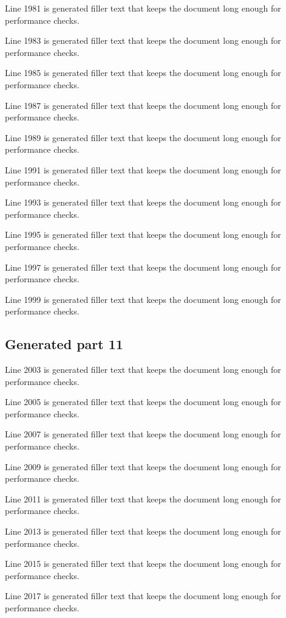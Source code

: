 Line 1981 is generated filler text that keeps the document long enough for performance checks.

Line 1983 is generated filler text that keeps the document long enough for performance checks.

Line 1985 is generated filler text that keeps the document long enough for performance checks.

Line 1987 is generated filler text that keeps the document long enough for performance checks.

Line 1989 is generated filler text that keeps the document long enough for performance checks.

Line 1991 is generated filler text that keeps the document long enough for performance checks.

Line 1993 is generated filler text that keeps the document long enough for performance checks.

Line 1995 is generated filler text that keeps the document long enough for performance checks.

Line 1997 is generated filler text that keeps the document long enough for performance checks.

Line 1999 is generated filler text that keeps the document long enough for performance checks.

\subsection{Generated part 11}

Line 2003 is generated filler text that keeps the document long enough for performance checks.

Line 2005 is generated filler text that keeps the document long enough for performance checks.

Line 2007 is generated filler text that keeps the document long enough for performance checks.

Line 2009 is generated filler text that keeps the document long enough for performance checks.

Line 2011 is generated filler text that keeps the document long enough for performance checks.

Line 2013 is generated filler text that keeps the document long enough for performance checks.

Line 2015 is generated filler text that keeps the document long enough for performance checks.

Line 2017 is generated filler text that keeps the document long enough for performance checks.

